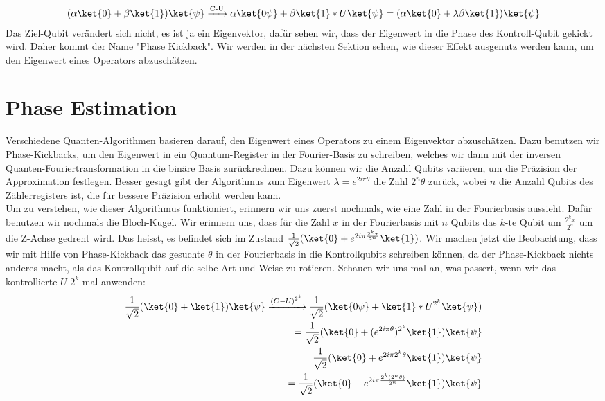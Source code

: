 \begin{align*}
(\alpha\ket{0} + \beta\ket{1})\ket{\psi} \xrightarrow{\text{C-U}} \alpha\ket{0\psi} + \beta\ket{1}*U\ket{\psi} = (\alpha\ket{0} + \lambda\beta\ket{1})\ket{\psi}
\end{align*}
Das Ziel-Qubit verändert sich nicht, es ist ja ein Eigenvektor, dafür sehen wir, dass der Eigenwert in die Phase des Kontroll-Qubit gekickt wird. Daher kommt der Name "Phase Kickback". Wir werden in der nächsten Sektion sehen, wie dieser Effekt ausgenutz werden kann, um den Eigenwert eines Operators abzuschätzen.

\section{Phase Estimation}
Verschiedene Quanten-Algorithmen basieren darauf, den Eigenwert eines Operators zu einem Eigenvektor abzuschätzen. Dazu benutzen wir Phase-Kickbacks, um den Eigenwert in ein Quantum-Register in der Fourier-Basis zu schreiben, welches wir dann mit der inversen Quanten-Fouriertransformation in die binäre Basis zurückrechnen. Dazu können wir die Anzahl Qubits variieren, um die Präzision der Approximation festlegen. Besser gesagt gibt der Algorithmus zum Eigenwert $\lambda = e^{2i\pi\theta}$ die Zahl $2^n\theta$ zurück, wobei $n$ die Anzahl Qubits des Zählerregisters ist, die für bessere Präzision erhöht werden kann. 
\\
Um zu verstehen, wie dieser Algorithmus funktioniert, erinnern wir uns zuerst nochmals, wie eine Zahl in der Fourierbasis aussieht. Dafür benutzen wir nochmals die Bloch-Kugel. Wir erinnern uns, dass für die Zahl $x$ in der Fourierbasis mit $n$ Qubits das $k$-te Qubit um $\frac{2^kx}{2^n}$ um die Z-Achse gedreht wird. Das heisst, es befindet sich im Zustand $\frac{1}{\sqrt{2}}(\ket{0} + e^{2i\pi\frac{2^kx}{2^n}}\ket{1})$. Wir machen jetzt die Beobachtung, dass wir mit Hilfe von Phase-Kickback das gesuchte $\theta$ in der Fourierbasis in die Kontrollqubits schreiben können, da der Phase-Kickback nichts anderes macht, als das Kontrollqubit auf die selbe Art und Weise zu rotieren. Schauen wir uns mal an, was passert, wenn wir das kontrollierte $U$ $2^k$ mal anwenden:
\begin{align*}
\frac{1}{\sqrt{2}}(\ket{0} + \ket{1})\ket{\psi} \xrightarrow{(C-U)^{2^k}} \frac{1}{\sqrt{2}}(\ket{0\psi} + \ket{1}*U^{2^k}\ket{\psi}) \\ = \frac{1}{\sqrt{2}}(\ket{0} + (e^{2i\pi\theta})^{2^k}\ket{1})\ket{\psi} \\
= \frac{1}{\sqrt{2}}(\ket{0} + e^{2i\pi2^k\theta}\ket{1})\ket{\psi} \\
= \frac{1}{\sqrt{2}}(\ket{0} + e^{2i\pi\frac{2^k(2^n\theta)}{2^n}}\ket{1})\ket{\psi}
\end{align*}
